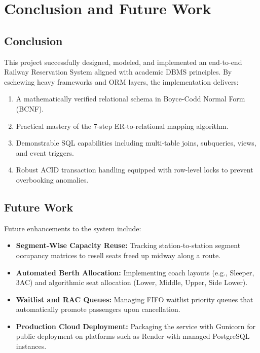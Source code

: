 \documentclass[12pt,a4paper]{report}
\begin{document}
\chapter{Conclusion and Future Work}

\section{Conclusion}
This project successfully designed, modeled, and implemented an end-to-end Railway Reservation System aligned with academic DBMS principles. By eschewing heavy frameworks and ORM layers, the implementation delivers:
\begin{enumerate}
    \item A mathematically verified relational schema in Boyce-Codd Normal Form (BCNF).
    \item Practical mastery of the 7-step ER-to-relational mapping algorithm.
    \item Demonstrable SQL capabilities including multi-table joins, subqueries, views, and event triggers.
    \item Robust ACID transaction handling equipped with row-level locks to prevent overbooking anomalies.
\end{enumerate}

\section{Future Work}
Future enhancements to the system include:
\begin{itemize}
    \item \textbf{Segment-Wise Capacity Reuse:} Tracking station-to-station segment occupancy matrices to resell seats freed up midway along a route.
    \item \textbf{Automated Berth Allocation:} Implementing coach layouts (e.g., Sleeper, 3AC) and algorithmic seat allocation (Lower, Middle, Upper, Side Lower).
    \item \textbf{Waitlist and RAC Queues:} Managing FIFO waitlist priority queues that automatically promote passengers upon cancellation.
    \item \textbf{Production Cloud Deployment:} Packaging the service with Gunicorn for public deployment on platforms such as Render with managed PostgreSQL instances.
\end{itemize}
\end{document}
